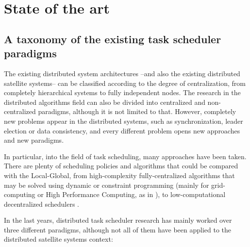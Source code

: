 
\chapter{State of the art} %

\label{Chapter2} %


\section{A taxonomy of the existing task scheduler paradigms}

The existing distributed system architectures --and also the existing distributed satellite systems-- can be classified according to the degree of centralization, from completely hierarchical systems to fully independent nodes. The research in the distributed algorithms field can also be divided into centralized and non-centralized paradigms, although it is not limited to that. However, completely new problems appear in the distributed systems, such as synchronization, leader election or data consistency,  and every different problem opens new approaches and new paradigms.

In particular, into the field of task scheduling, many approaches have been taken. There are plenty of scheduling policies and algorithms that could be compared with the Local-Global, from high-complexity fully-centralized algorithms that may be solved using dynamic or constraint programming (mainly for grid-computing or High Performance Computing, as in \cite{anderson2005high,ramamritham1984dynamic,yu2005taxonomy}), to low-computational decentralized schedulers \citep{1310996,zhu2007tasks}.

In the last years, distributed task scheduler research has mainly worked over three different paradigms, although not all of them have been applied to the distributed satellite systems context:

